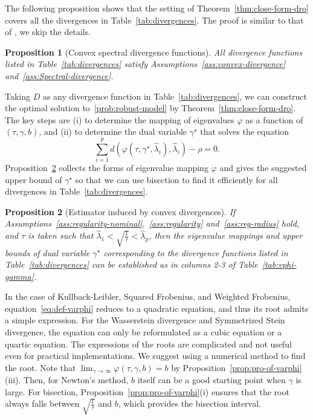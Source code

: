 \documentclass[11pt]{article}
\newtheorem{proposition}{Proposition}
\newcommand{\opt}{^\star}
\newcommand{\wh}{\widehat}
\begin{document}
The following proposition shows that the setting of Theorem~\ref{thm:close-form-dro} covers all the divergences in Table~\ref{tab:divergences}. The proof is similar to that of \citet[Theorem 2]{ref:yue2024geometric}, we skip the details.

\begin{proposition}[Convex spectral divergence functions]\label{thm:convex-divergence} All divergence functions listed in Table~\ref{tab:divergences} satisfy Assumptions~\ref{ass:convex-divergence} and~\ref{ass:Spectral-divergence}.
\end{proposition}


Taking $D$ as any divergence function in Table~\ref{tab:divergences}, we can construct the optimal solution to~\eqref{prob:robust-model} by Theorem~\ref{thm:close-form-dro}. The key steps are (i) to determine the mapping of eigenvalues $\varphi$ as a function of $(\tau,\gamma,b)$, and (ii) to determine the dual variable $\gamma\opt$ that solves the equation 
\[
\sum_{i=1}^p d(\varphi(\tau, \gamma\opt, \widehat{\lambda}_i), \widehat{\lambda}_i)- \rho=0.
\]
Proposition~\ref{prop:vphi-gamma} collects the forms of eigenvalue mapping $\varphi$ and gives the suggested upper bound of $\gamma\opt$ so that we can use bisection to find it efficiently for all divergences in Table~\ref{tab:divergences}.




\begin{proposition}[Estimator induced by convex divergences]\label{prop:vphi-gamma}
    If Assumptions~\ref{ass:regularity-nominal},~\ref{ass:regularity} and~\ref{ass:reg-radius} hold, and $\tau$ is taken such that $\wh\lambda_1<\sqrt{\frac{1}{\tau}} < \wh\lambda_p$, then the eigenvalue mappings and upper bounds of dual variable $\gamma\opt$ 
        corresponding to the divergence functions listed in Table~\ref{tab:divergences} 
        can be established as 
        in columns 2-3 of
        Table~\ref{tab:vphi-gamma}.
\end{proposition}

In the case of Kullback-Leibler, Squared Frobenius, and Weighted Frobenius, equation~\eqref{eq:def-varphi} reduces to a quadratic equation, and thus its root admits a simple expression. For the Wasserstein divergence and Symmetrized Stein divergence, the equation can only be reformulated as a cubic equation or a quartic equation. The expressions of the roots are complicated and not useful even for practical implementations. We suggest using a numerical method to find the root. Note that $\lim_{\gamma\to\infty}\varphi(\tau,\gamma,b)=b$ by Proposition~\ref{prop:pro-of-varphi}(iii). Then, for Newton's method, $b$ itself can be a good starting point when $\gamma$ is large.  For bisection, Proposition~\ref{prop:pro-of-varphi}(i) ensures that the root always falls between $\sqrt{\frac{1}{\tau}}$ and $b$, which provides the bisection interval.
\end{document}

